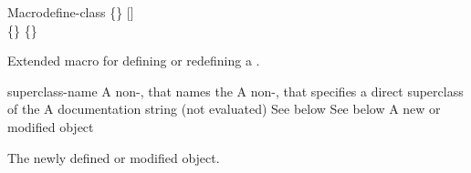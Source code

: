 \documentclass[10pt,twoside,english,pdftex]{article}
\begin{document}

\begin{functiondoc}{Macro}{define-class}{ 
   \code{(}\{\}\superstar\code{)}
   [] \\
   \code{(}\{\}\superstar\code{)}
   \{\}\superstar{} 
   \returns{} }
%
%
%

\fnsyntax

\fnpurpose Extended macro for defining or redefining a .

\fnpackage {}

\fnmodule {}

\fnargs
\begin{args}{superclass-name}
 A non-\nil,  that names the
 A non-\nil,  that specifies a
direct superclass of the    
\arg[documentation] A documentation string (not evaluated)
 See below
 See below
 A new or modified  object
\end{args}

\fnreturns The newly defined or modified  object.


\end{functiondoc}
\end{document}
